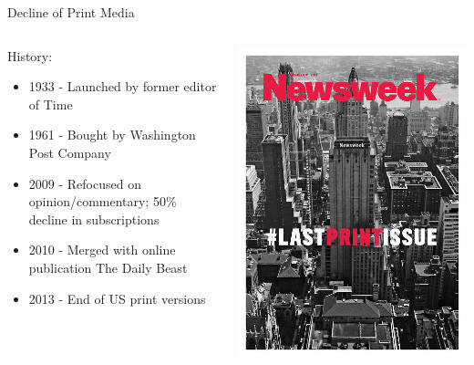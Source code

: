 \documentclass{beamer}
\begin{document}
\begin{frame}{Decline of Print Media}
\begin{columns}
\begin{column}{0.5\textwidth}
History:
\begin{itemize}
\item 1933 - Launched by former editor of Time
\item 1961 - Bought by Washington Post Company
\item 2009 - Refocused on opinion/commentary; 50\% decline in subscriptions
\item 2010 - Merged with online publication The Daily Beast
\item 2013 - End of US print versions
\end{itemize}
\bigskip
{}
\end{column}
\begin{column}{0.45\textwidth}
\includegraphics[width=\textwidth]{Newsweek_final_issue.jpg}
\end{column}
\end{columns}
\end{frame}
\end{document}

